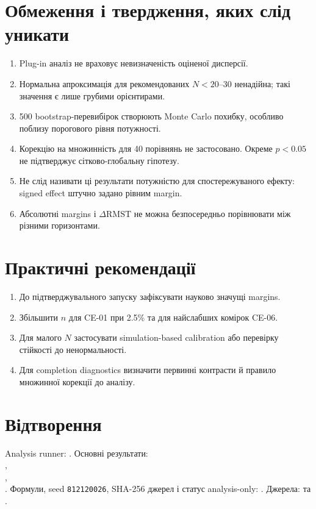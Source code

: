 \documentclass[11pt,a4paper]{article}
\begin{document}
\section{Обмеження і твердження, яких слід уникати}\label{sec:limits}

\begin{enumerate}
  \item Plug-in аналіз не враховує невизначеність оціненої дисперсії.
  \item Нормальна апроксимація для рекомендованих $N<20$--$30$ ненадійна;
  такі значення є лише грубими орієнтирами.
  \item 500 bootstrap-перевибірок створюють Monte Carlo похибку, особливо
  поблизу порогового рівня потужності.
  \item Корекцію на множинність для 40 порівнянь не застосовано. Окреме
  $p<0.05$ не підтверджує сітково-глобальну гіпотезу.
  \item Не слід називати ці результати потужністю для спостережуваного ефекту:
  signed effect штучно задано рівним margin.
  \item Абсолютні margins і $\Delta\mathrm{RMST}$ не можна безпосередньо
  порівнювати між різними горизонтами.
\end{enumerate}

\section{Практичні рекомендації}\label{sec:recommendations}

\begin{enumerate}
  \item До підтверджувального запуску зафіксувати науково значущі margins.
  \item Збільшити $n$ для CE-01 при 2.5\% та для найслабших комірок CE-06.
  \item Для малого $N$ застосувати simulation-based calibration або
  перевірку стійкості до ненормальності.
  \item Для completion diagnostics визначити первинні контрасти й правило
  множинної корекції до аналізу.
\end{enumerate}

\section{Відтворення}\label{sec:reproduction}

Analysis runner: .
Основні результати: \\
, \\
, \\
.
Формули, seed \texttt{812120026}, SHA-256 джерел і статус analysis-only:
.
Джерела: 
та .
\end{document}
